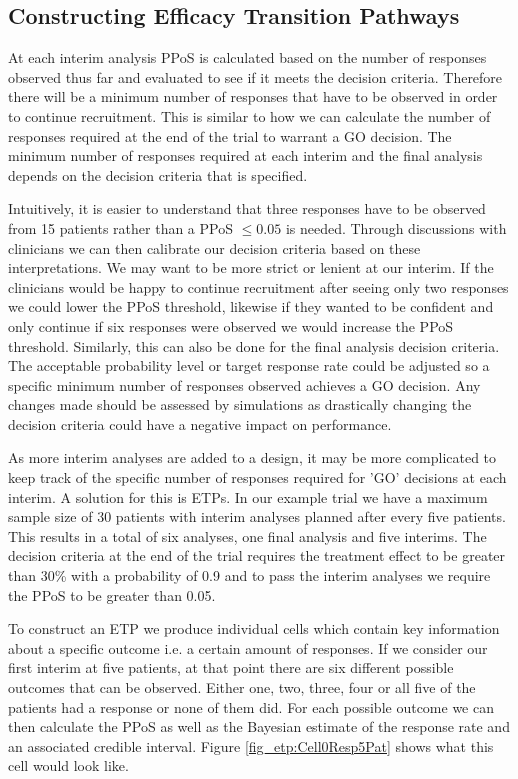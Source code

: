 \subsection{Constructing Efficacy Transition Pathways} 
\label{etp:conETPs}

At each interim analysis PPoS is calculated based on the number of responses observed thus far and evaluated to see if it meets the decision criteria. Therefore there will be a minimum number of responses that have to be observed in order to continue recruitment. This is similar to how we can calculate the number of responses required at the end of the trial to warrant a GO decision. The minimum number of responses required at each interim and the final analysis depends on the decision criteria that is specified. 

Intuitively, it is easier to understand that three responses have to be observed from 15 patients rather than a PPoS $\leq 0.05$ is needed. Through discussions with clinicians we can then calibrate our decision criteria based on these interpretations. We may want to be more strict or lenient at our interim. If the clinicians would be happy to continue recruitment after seeing only two responses we could lower the PPoS threshold, likewise if they wanted to be confident and only continue if six responses were observed we would increase the PPoS threshold. Similarly, this can also be done for the final analysis decision criteria. The acceptable probability level or target response rate could be adjusted so a specific minimum number of responses observed achieves a GO decision. Any changes made should be assessed by simulations as drastically changing the decision criteria could have a negative impact on performance. 
 
As more interim analyses are added to a design, it may be more complicated to keep track of the specific number of responses required for 'GO' decisions at each interim. A solution for this is ETPs. In our example trial we have a maximum sample size of 30 patients with interim analyses planned after every five patients. This results in a total of six analyses, one final analysis and five interims. The decision criteria at the end of the trial requires the treatment effect to be greater than 30\% with a probability of 0.9 and to pass the interim analyses we require the PPoS to be greater than 0.05. 

To construct an ETP we produce individual cells which contain key information about a specific outcome i.e. a certain amount of responses. If we consider our first interim at five patients, at that point there are six different possible outcomes that can be observed. Either one, two, three, four or all five of the patients had a response or none of them did. For each possible outcome we can then calculate the PPoS as well as the Bayesian estimate of the response rate and an associated credible interval. Figure \ref{fig_etp:Cell0Resp5Pat} shows what this cell would look like. 


